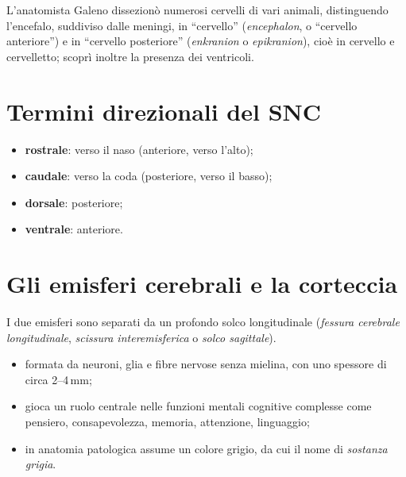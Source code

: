 L'anatomista Galeno dissezionò numerosi cervelli di vari animali,
distinguendo l'encefalo, suddiviso dalle meningi, in ``cervello''
(\textit{encephalon}, o ``cervello anteriore'') e in ``cervello posteriore''
(\textit{enkranion} o \textit{epikranion}), cioè in cervello e cervelletto;
scoprì inoltre la presenza dei ventricoli.

\section{Termini direzionali del SNC}

\begin{itemize}
  \item \textbf{rostrale}: verso il naso (anteriore, verso l'alto);
  \item \textbf{caudale}: verso la coda (posteriore, verso il basso);
  \item \textbf{dorsale}: posteriore;
  \item \textbf{ventrale}: anteriore.
\end{itemize}

\section{Gli emisferi cerebrali e la corteccia}

I due emisferi sono separati da un profondo solco longitudinale (\textit{fessura
cerebrale longitudinale}, \textit{scissura interemisferica} o \textit{solco
sagittale}).

\begin{itemize}
  \item formata da neuroni, glia e fibre nervose senza mielina, con uno
    spessore di circa 2--4\,mm;
  \item gioca un ruolo centrale nelle funzioni mentali cognitive complesse
    come pensiero, consapevolezza, memoria, attenzione, linguaggio;
  \item in anatomia patologica assume un colore grigio, da cui il nome di
    \textit{sostanza grigia}.
\end{itemize}

